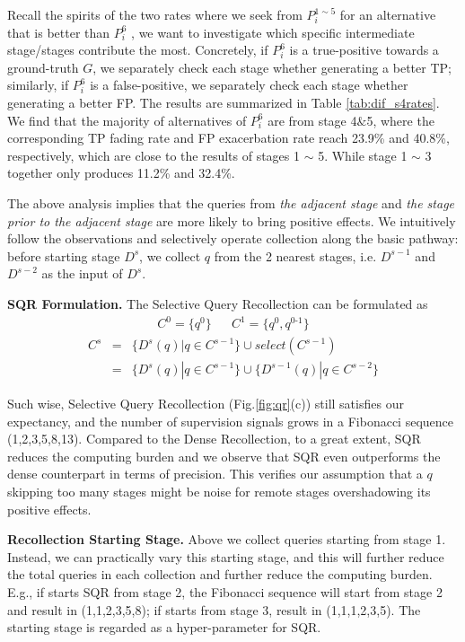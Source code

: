 \documentclass[10pt,twocolumn,letterpaper]{article}
\begin{document}
Recall the spirits of the two rates where we seek from $P_i^{1\sim 5}$ for an alternative that is better than $P_i^6$ , we want to investigate which specific intermediate stage/stages contribute the most. 
Concretely, if $P_i^6$ is a true-positive towards a ground-truth $G$, we separately check each stage whether generating a better TP; similarly, if $P_i^6$ is a false-positive, we separately check each stage whether generating a better FP. The results are summarized in Table \ref{tab:dif_s4rates}. We find that the majority of alternatives of $P_i^6$ are from stage 4$\&$5, where the corresponding TP fading rate and FP exacerbation rate reach 23.9\% and 40.8\%, respectively, which are close to the results of stages 1 $\sim$ 5. While stage 1 $\sim$ 3 together only produces 11.2\% and 32.4\%. 

The above analysis implies that the queries from \emph{the adjacent stage} and \emph{the stage prior to the adjacent stage} are more likely to bring positive effects. We intuitively follow the observations and selectively operate collection along the basic pathway: before starting stage $D^s$, we collect $q$ from the 2 nearest stages, i.e. $D^{s-1}$ and $D^{s-2}$ as the input of $D^s$. 

\textbf{SQR Formulation.} The Selective Query Recollection can be formulated as
\begin{eqnarray}
\label{eq:denseSQR1}
    C^0 = \{q^0\} & & C^1 = \{q^0, q^{0\text{-}1}\} 
\end{eqnarray}
\begin{eqnarray}
\label{eq:denseSQR3}
C^s & = & \{D^s(q)|q\in C^{s-1}\} \cup select(C^{s-1})\\
 & = & \{D^s(q)|q\in C^{s-1}\} \cup \{D^{s-1}(q)|q\in C^{s-2}\}
\end{eqnarray}

Such wise, Selective Query Recollection (Fig.\ref{fig:qr}(c)) still satisfies our expectancy, and the number of supervision signals grows in a Fibonacci sequence (1,2,3,5,8,13). Compared to the Dense Recollection, to a great extent, SQR reduces the computing burden and we observe that SQR even outperforms the dense counterpart in terms of precision. This verifies our assumption that a $q$ skipping too many stages might be noise for remote stages overshadowing its positive effects. 

\textbf{Recollection Starting Stage.} Above we collect queries starting from stage 1. Instead, we can practically vary this starting stage, and this will further reduce the total queries in each collection and further reduce the computing burden. E.g., if starts SQR from stage 2, the Fibonacci sequence will start from stage 2 and result in (1,1,2,3,5,8); if starts from stage 3, result in (1,1,1,2,3,5). The starting stage is regarded as a hyper-parameter for SQR.
\end{document}
